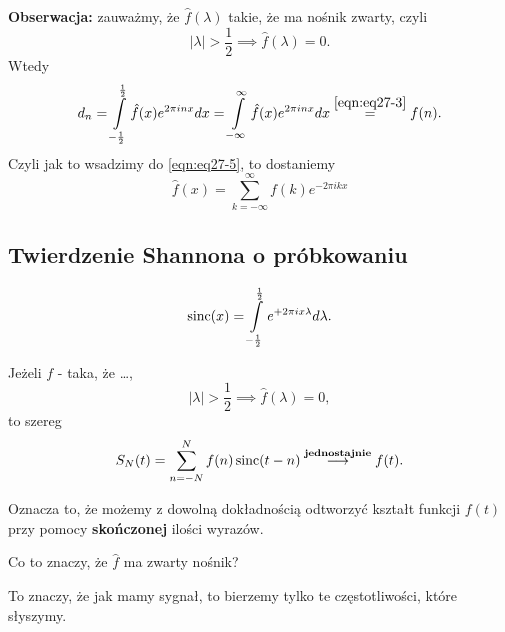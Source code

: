 \documentclass[../main.tex]{subfiles}
\begin{document}
\textbf{Obserwacja:} zauważmy, że $\hat{f}(\lambda)$ takie, że ma nośnik zwarty, czyli
\[
    |\lambda| > \frac{1}{2} \implies \hat{f}(\lambda) = 0
.\]
Wtedy
\[
    d_n = \int\limits_{-\frac{1}{2}}^{\frac{1}{2}} \hat{f}(x)e^{2\pi i n x}dx = \int\limits_{-\infty}^{\infty} \hat{f}(x) e^{2\pi i nx}dx \overset{\eqref{eqn:eq27-3}}{=}  f(n)
.\]
Czyli jak to wsadzimy do \eqref{eqn:eq27-5}, to dostaniemy
\begin{equation}
    \label{eqn:eq27-6}
    \hat{f}(x) = \sum_{k=-\infty}^{\infty} f(k)e^{-2\pi i k x}
\end{equation}
\subsection{Twierdzenie Shannona o próbkowaniu}
\begin{definicja}
    \[
        \operatorname{sinc}(x) = \int\limits_{-\frac{1}{2}}^{\frac{1}{2}} e^{+2\pi i x \lambda}d\lambda
    .\]
\end{definicja}
\begin{tw}
    Jeżeli $f$ - taka, że \ldots,
    \[
        |\lambda| > \frac{1}{2} \implies \hat{f}(\lambda) = 0
    ,\]
to szereg
\[
    S_N(t) = \sum_{n=-N}^{N} f(n) \operatorname{sinc}(t-n) \overset{\textbf{jednostajnie}}{\longrightarrow}  f(t)
.\]
\end{tw}
Oznacza to, że możemy z dowolną dokładnością odtworzyć kształt funkcji $f(t)$ przy pomocy \textbf{skończonej} ilości wyrazów.\\
\begin{pytanie}
    Co to znaczy, że $\hat{f}$ ma zwarty nośnik?
\end{pytanie}
To znaczy, że jak mamy sygnał, to bierzemy tylko te częstotliwości, które słyszymy.
\end{document}
